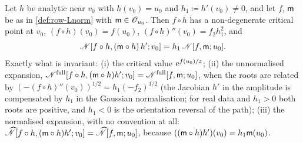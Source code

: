 \begin{prop}
\label{prop:row-P1}
Let $h$ be analytic near $v_0$ with $h(v_0)=u_0$ and $h_1\coloneqq h'(v_0)\neq0$, and let $f$, $\mathsf{m}$ be as in \cref{def:row-Lnorm} with $\mathsf{m}\in\mathscr{O}_{u_0}$. Then $f\circ h$ has a non-degenerate critical point at $v_0$, $(f\circ h)(v_0)=f(u_0)$, $(f\circ h)''(v_0)=f_2h_1^2$, and
\begin{equation}
\label{eq:row-P1}
\mathscr{N}[f\circ h,(\mathsf{m}\circ h)\,h';v_0]=h_1\,\mathscr{N}[f,\mathsf{m};u_0].
\end{equation}
Exactly what is invariant: (i) the critical value $\mathrm{e}^{f(u_0)/z}$; (ii) the unnormalised expansion, $\mathscr{N}^{\mathrm{full}}[f\circ h,(\mathsf{m}\circ h)h';v_0]=\mathscr{N}^{\mathrm{full}}[f,\mathsf{m};u_0]$, when the roots are related by $(-(f\circ h)''(v_0))^{1/2}=h_1(-f_2)^{1/2}$ (the Jacobian $h'$ in the amplitude is compensated by $h_1$ in the Gaussian normalisation; for real data and $h_1>0$ both roots are positive, and $h_1<0$ is the orientation reversal of the path); (iii) the normalised expansion, with no convention at all: $\widehat{\mathscr{N}}[f\circ h,(\mathsf{m}\circ h)h';v_0]=\widehat{\mathscr{N}}[f,\mathsf{m};u_0]$, because $((\mathsf{m}\circ h)h')(v_0)=h_1\mathsf{m}(u_0)$.
\end{prop}

